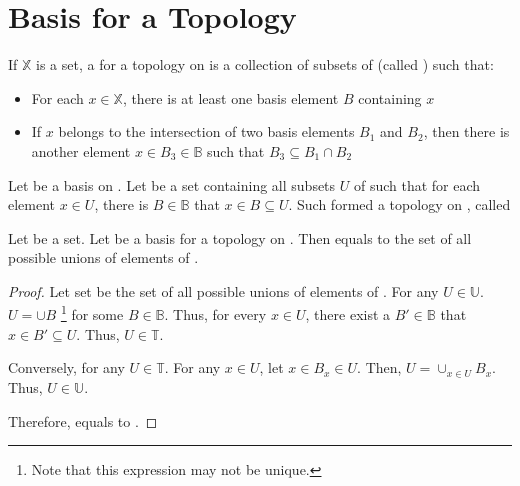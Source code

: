 \section{Basis for a Topology}

      \begin{definition}[basis]\label{def:Basis}
            If $ \mathbb{X} $ is a set, a  for a topology on  is a collection  of subsets of  (called ) such that:
            \begin{itemize}
                  \item For each $ x \in \mathbb{X} $, there is at least one basis element $ B $ containing $ x $
                  \item If $ x $ belongs to the intersection of two basis elements $ B_{1} $ and $ B_{2} $, then there is another element $ x \in B_{3} \in \mathbb{B} $ such that $ B_{3} \subseteq B_{1} \cap B_{2} $
            \end{itemize}
      \end{definition}

      \begin{definition}\label{def:TopologyGeneratedByBasis}
            Let  be a basis on . Let  be a set containing all subsets $ U $ of  such that for each element $ x \in U $, there is $ B \in \mathbb{B} $ that $ x \in B \subseteq U $.
            Such  formed a topology on , called 
      \end{definition}
      
      \begin{lemma}
            Let  be a set. Let  be a basis for a topology  on . Then  equals to the set of all possible unions of elements of .
      \end{lemma}

      \begin{proof}
            Let set  be the set of all possible unions of elements of . For any $ U \in \mathbb{U} $. $ U = \cup B $ \footnote{
                  Note that this expression may not be unique.
            } for some $ B \in \mathbb{B} $. Thus, for every $ x \in U $, there exist a $ B' \in \mathbb{B} $ that $ x \in B' \subseteq U $. Thus, $ U \in \mathbb{T} $.

            Conversely, for any $ U \in \mathbb{T} $. For any $ x \in U $, let $ x \in B_{x} \in U $. Then, $ U = \cup_{x \in U}B_{x} $. Thus, $ U \in \mathbb{U} $.

            Therefore,  equals to .
      \end{proof}

